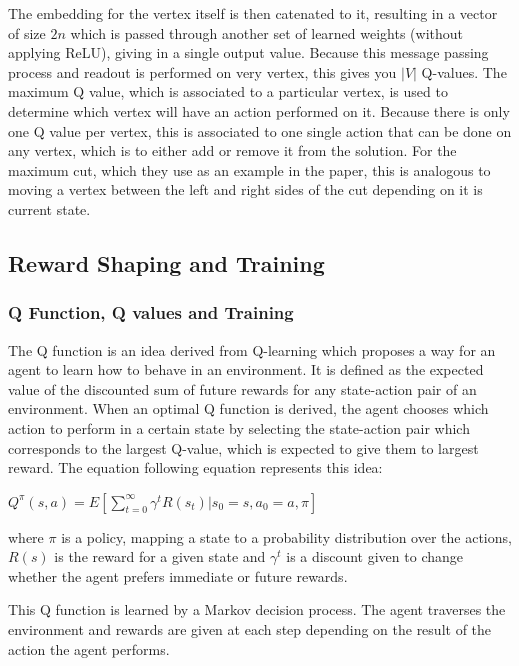 \documentclass{article}
\begin{document}
The embedding for the vertex itself is then catenated to it, resulting in a vector of size $2n$ which is passed through another set of learned weights (without applying ReLU), giving in a single output value. Because this message passing process and readout is performed on very vertex, this gives you $|V|$ Q-values. The maximum Q value, which is associated to a particular vertex, is used to determine which vertex will have an action performed on it. Because there is only one Q value per vertex, this is associated to one single action that can be done on any vertex, which is to either add or remove it from the solution. For the maximum cut, which they use as an example in the paper, this is analogous to moving a vertex between the left and right sides of the cut depending on it is current state. 

\subsection{Reward Shaping and Training}

\subsubsection{Q Function, Q values and Training}

The Q function is an idea derived from Q-learning \cite{qlearning} which proposes a way for an agent to learn how to behave in an environment. It is defined as the expected value of the discounted sum of future rewards for any state-action pair of an environment. When an optimal Q function is derived, the agent chooses which action to perform in a certain state by selecting the state-action pair which corresponds to the largest Q-value, which is expected to give them to largest reward. The equation following equation represents this idea:
 
$Q^\pi(s, a) = E[\sum_{t=0}^{\infty} \gamma^t R(s_t) | s_0 = s, a_0 = a, \pi]$

where $\pi$ is a policy, mapping a state to a probability distribution over the actions, $R(s)$ is the reward for a given state and $\gamma^t$ is a discount given to change whether the agent prefers immediate or future rewards.

This Q function is learned by a Markov decision process. The agent traverses the environment and rewards are given at each step depending on the result of the action the agent performs.
\end{document}
